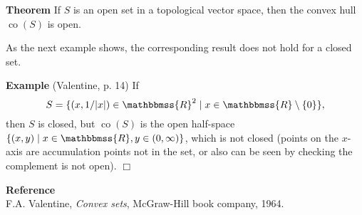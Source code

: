 \documentclass[12pt]{article}
\newcommand{\R}{\mathbbmss{R}}
\newcommand{\cull}[0]{\operatorname{co}}
\begin{document}
{\bf Theorem} 
If $S$ is an open set in a topological vector space, then 
the convex hull $\cull (S)$ is open.


As the next example shows, the corresponding result does not hold for a closed set.

{\bf Example} (Valentine, p. 14)
If $$ S=\{ (x,1/|x|)\in \R^2 \mid x\in \R\setminus \{0\} \},$$
then $S$ is closed, 
but $\cull (S)$ is the open half-space $\{(x,y) \mid x\in \R, y\in(0,\infty) \}$,
which is not closed  (points on the $x$-axis are accumulation points not in the set, or also can be seen by checking the complement is not open). $\Box$ 

\textbf{Reference}\\
F.A. Valentine, \emph{Convex sets}, McGraw-Hill book company, 1964.
\end{document}
